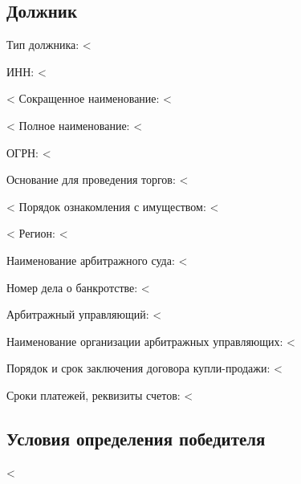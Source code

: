 \documentclass[a4paper,12pt]{article}
\begin{document}
{{{{{{{	\fontsize{12pt}{14pt}\selectfont

	\subsection*{Должник}
        {\color{Gray} Тип должника:} <%
        \par
        {\color{Gray} ИНН:} <%
        \par
        <%
            {\color{Gray} Сокращенное наименование:} <%
        	\par
        <%
        {\color{Gray} Полное наименование:} <%
        \par
        {\color{Gray} ОГРН:} <%
        \par
        {\color{Gray} Основание для проведения торгов:} <%
        \par
        <%
            {\color{Gray} Порядок ознакомления с имуществом:} <%
        	\par
        <%
        {\color{Gray} Регион:} <%
        \par
        {\color{Gray} Наименование арбитражного суда:} <%
        \par
        {\color{Gray} Номер дела о банкротстве:} <%
        \par
        {\color{Gray} Арбитражный управляющий:} <%
        \par
        {\color{Gray} Наименование организации арбитражных управляющих:} <%
        \par
        {\color{Gray} Порядок и срок заключения договора купли-продажи:} <%
        \par
        {\color{Gray} Сроки платежей, реквизиты счетов:} <%


	\subsection*{Условия определения победителя}
		<%

}}}}}}}
\end{document}
